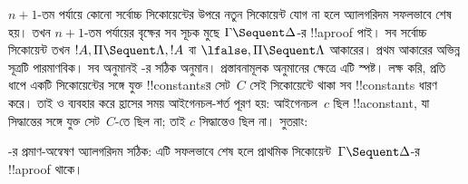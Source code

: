 \documentclass[../../../include/open-logic-section]{subfiles}
\begin{document}
$n+1$-তম পর্যায়ে কোনো সর্বোচ্চ সিকোয়েন্টের উপরে নতুন সিকোয়েন্ট
যোগ না হলে অ্যালগরিদম সফলভাবে শেষ হয়। তখন $n+1$-তম
পর্যায়ের বৃক্ষের সব সূচক মুছে $\Gamma \Sequent \Delta$-র
!!a{proof} পাই। সব সর্বোচ্চ সিকোয়েন্ট তখন
$!A, \Pi \Sequent \Lambda, !A$ বা
$\lfalse, \Pi \Sequent \Lambda$ আকারের। প্রথম আকারের অভিন্ন সূত্রটি পারমাণবিক। সব অনুমানই
-র সঠিক অনুমান। প্রস্তাবনামূলক অনুমানের ক্ষেত্রে
এটি স্পষ্ট। লক্ষ করি, প্রতি ধাপে একটি সিকোয়েন্টের সঙ্গে যুক্ত
!!{constant}sর সেট~$C$ সেই সিকোয়েন্টে থাকা সব
!!{constant}s ধারণ করে। তাই \LeftR{\lexists} ও
\RightR{\lforall} ব্যবহার করে হ্রাসের সময় আইগেনচল-শর্ত
পূরণ হয়: আইগেনচল~$c$ ছিল !!a{constant}, যা
সিদ্ধান্তের সঙ্গে যুক্ত সেট~$C$-তে ছিল না; তাই $c$
সিদ্ধান্তেও ছিল না। সুতরাং:

\begin{prop}
-র প্রমাণ-অন্বেষণ অ্যালগরিদম সঠিক: এটি সফলভাবে শেষ
হলে প্রাথমিক সিকোয়েন্ট~$\Gamma \Sequent \Delta$-র !!a{proof}
থাকে।
\end{prop}
\end{document}
